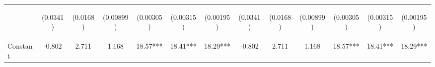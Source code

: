 \documentclass[]{article}
\begin{document}
\begin{center}
\begin{tabular}{lcccccccccccc}
\vspace{4pt} & \begin{footnotesize}(0.0341)\end{footnotesize} & \begin{footnotesize}(0.0168)\end{footnotesize} & \begin{footnotesize}(0.00899)\end{footnotesize} & \begin{footnotesize}(0.00305)\end{footnotesize} & \begin{footnotesize}(0.00315)\end{footnotesize} & \begin{footnotesize}(0.00195)\end{footnotesize} & \begin{footnotesize}(0.0341)\end{footnotesize} & \begin{footnotesize}(0.0168)\end{footnotesize} & \begin{footnotesize}(0.00899)\end{footnotesize} & \begin{footnotesize}(0.00305)\end{footnotesize} & \begin{footnotesize}(0.00315)\end{footnotesize} & \begin{footnotesize}(0.00195)\end{footnotesize} \\
Constant & -0.802 & 2.711 & 1.168 & 18.57*** & 18.41*** & 18.29*** & -0.802 & 2.711 & 1.168 & 18.57*** & 18.41*** & 18.29*** \\

\end{tabular}
\end{center}
\end{document}
